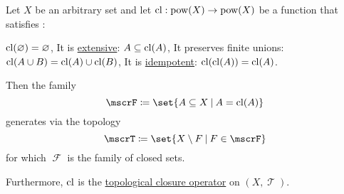 \begin{proposition}\label{thm:topology_from_closure_operator}
  Let \( X \) be an arbitrary set and let \( \operatorname{cl}: \operatorname{pow}(X) \to \operatorname{pow}(X) \) be a function that satisfies :
  \begin{thmenum}
     \( \operatorname{cl}(\varnothing) = \varnothing \),
     It is \hyperref[def:extensive_function]{extensive}: \( A \subseteq \operatorname{cl}(A) \),
     It preserves finite unions: \( \operatorname{cl}(A \cup B) = \operatorname{cl}(A) \cup \operatorname{cl}(B) \),
     It is \hyperref[def:magma/idempotent]{idempotent}: \( \operatorname{cl}(\operatorname{cl}(A)) = \operatorname{cl}(A) \).
  \end{thmenum}

  Then the family
  \begin{equation*}
    \mscrF \coloneqq \set{ A \subseteq X \given A = \cl(A) }
  \end{equation*}
  generates via  the topology
  \begin{equation*}
    \mscrT \coloneqq \set{ X \setminus F \given F \in \mscrF }
  \end{equation*}
  for which \( \mscrF \) is the family of closed sets.

  Furthermore, \( \operatorname{cl} \) is the \hyperref[def:topological_closure_operator]{topological closure operator} on \( (X, \mscrT) \).
\end{proposition}

